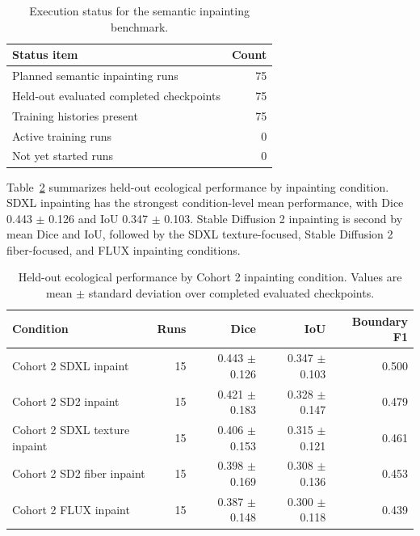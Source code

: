 \documentclass{article}
\begin{document}
\begin{table}[H]
  \centering
  \caption{Execution status for the semantic inpainting benchmark.}
  \label{tab:current-status}
  \begin{tabular}{lr}
    \toprule
    \textbf{Status item} & \textbf{Count} \\
    \midrule
    Planned semantic inpainting runs & 75 \\
    Held-out evaluated completed checkpoints & 75 \\
    Training histories present & 75 \\
    Active training runs & 0 \\
    Not yet started runs & 0 \\
    \bottomrule
  \end{tabular}
\end{table}

Table~\ref{tab:c2-condition-results} summarizes held-out ecological performance by inpainting condition. SDXL inpainting has the strongest condition-level mean performance, with Dice 0.443 $\pm$ 0.126 and IoU 0.347 $\pm$ 0.103. Stable Diffusion 2 inpainting is second by mean Dice and IoU, followed by the SDXL texture-focused, Stable Diffusion 2 fiber-focused, and FLUX inpainting conditions.

\begin{table}[H]
  \centering
  \caption{Held-out ecological performance by Cohort 2 inpainting condition. Values are mean $\pm$ standard deviation over completed evaluated checkpoints.}
  \label{tab:c2-condition-results}
  \begin{tabular}{lrrrr}
    \toprule
    \textbf{Condition} & \textbf{Runs} & \textbf{Dice} & \textbf{IoU} & \textbf{Boundary F1} \\
    \midrule
    Cohort 2 SDXL inpaint & 15 & 0.443 $\pm$ 0.126 & 0.347 $\pm$ 0.103 & 0.500 \\
    Cohort 2 SD2 inpaint & 15 & 0.421 $\pm$ 0.183 & 0.328 $\pm$ 0.147 & 0.479 \\
    Cohort 2 SDXL texture inpaint & 15 & 0.406 $\pm$ 0.153 & 0.315 $\pm$ 0.121 & 0.461 \\
    Cohort 2 SD2 fiber inpaint & 15 & 0.398 $\pm$ 0.169 & 0.308 $\pm$ 0.136 & 0.453 \\
    Cohort 2 FLUX inpaint & 15 & 0.387 $\pm$ 0.148 & 0.300 $\pm$ 0.118 & 0.439 \\
    \bottomrule
  \end{tabular}
\end{table}
\end{document}
